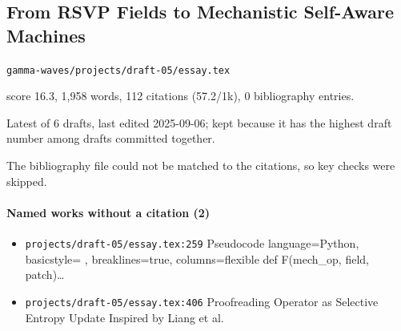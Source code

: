 \documentclass[11pt]{article}
\newcommand{\loc}[1]{{\small\color{muted}\texttt{#1}}}
\begin{document}
\subsection{From RSVP Fields to Mechanistic Self-Aware Machines}
\loc{gamma-waves/\allowbreak{}projects/\allowbreak{}draft-05/\allowbreak{}essay.tex}\par
score 16.3, 1,958 words, 112 citations (57.2/1k), 0 bibliography entries.

Latest of 6 drafts, last edited 2025-09-06; kept because it has the highest draft number among drafts committed together.

The bibliography file could not be matched to the citations, so key checks were skipped.

\paragraph{Named works without a citation (2)}
\begin{itemize}
\item \loc{projects/\allowbreak{}draft-05/\allowbreak{}essay.tex:259} Pseudocode language=Python, basicstyle= , breaklines=true, columns=flexible def F(mech\_op, field, patch)\ldots{}
\item \loc{projects/\allowbreak{}draft-05/\allowbreak{}essay.tex:406} Proofreading Operator as Selective Entropy Update Inspired by Liang et al.
\end{itemize}
\end{document}
